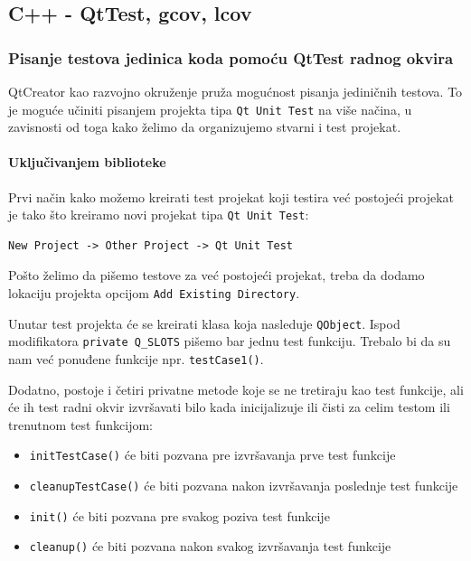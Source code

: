 \subsection{C++ - QtTest, gcov, lcov}\label{c---qttest-gcov-lcov}

\subsubsection{Pisanje testova jedinica koda pomoću QtTest radnog okvira}\label{pisanje-testova-jedinica-koda-pomoux107u-qttest-radnog-okvira}

QtCreator kao razvojno okruženje pruža mogućnost pisanja jediničnih testova. To je moguće učiniti pisanjem projekta tipa \texttt{Qt\ Unit\ Test} na više načina, u zavisnosti od toga kako želimo da organizujemo stvarni i test projekat.

\paragraph{Uključivanjem biblioteke}\label{ukljuux10divanjem-biblioteke}

Prvi način kako možemo kreirati test projekat koji testira već postojeći projekat je tako što kreiramo novi projekat tipa \texttt{Qt\ Unit\ Test}:

\begin{verbatim}
New Project -> Other Project -> Qt Unit Test
\end{verbatim}

Pošto želimo da pišemo testove za već postojeći projekat, treba da dodamo lokaciju projekta opcijom \texttt{Add\ Existing\ Directory}.

Unutar test projekta će se kreirati klasa koja nasleduje \texttt{QObject}. Ispod modifikatora \texttt{private\ Q\_SLOTS} pišemo bar jednu test funkciju. Trebalo bi da su nam već ponuđene funkcije npr. \texttt{testCase1()}.

Dodatno, postoje i četiri privatne metode koje se ne tretiraju kao test funkcije, ali će ih test radni okvir izvršavati bilo kada inicijalizuje ili čisti za celim testom ili trenutnom test funkcijom:

\begin{itemize}
\tightlist
\item
  \texttt{initTestCase()} će biti pozvana pre izvršavanja prve test funkcije
\item
  \texttt{cleanupTestCase()} će biti pozvana nakon izvršavanja poslednje test funkcije
\item
  \texttt{init()} će biti pozvana pre svakog poziva test funkcije
\item
  \texttt{cleanup()} će biti pozvana nakon svakog izvršavanja test funkcije
\end{itemize}

